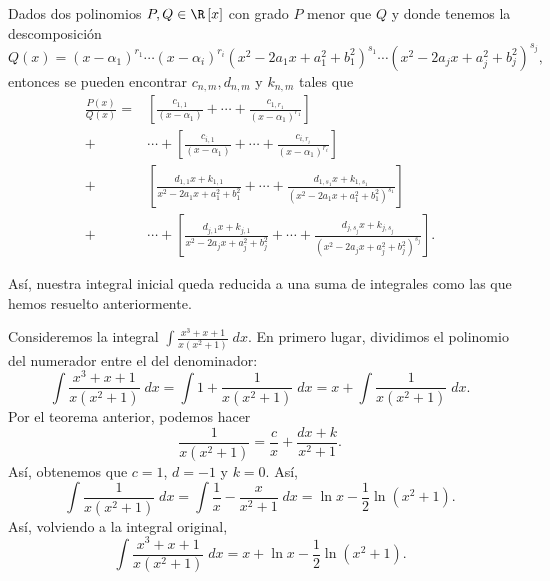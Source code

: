 \begin{ftheorem}[]
	\normalfont Dados dos polinomios $\displaystyle P,Q \in \R\left[x\right]  $ con grado $\displaystyle P $ menor que $\displaystyle Q $ y donde tenemos la descomposición
	\[Q\left(x\right) = \left(x-\alpha_{1}\right)^{r_{1}} \cdots \left(x-\alpha_{i}\right)^{r_{i}}\left(x^{2}-2a_{1}x+a_{1}^{2}+b^{2}_{1}\right)^{s _{1}} \cdots \left(x^{2}-2a_{j}x+a_{j}^{2}+b^{2}_{j}\right)^{s_{j}} ,\]
	entonces se pueden encontrar $\displaystyle c_{n,m}, d _{n,m} $ y $\displaystyle k_{n,m} $ tales que
	\[
	\begin{split}
		\frac{P\left(x\right)}{Q\left(x\right)} = & \left[\frac{c_{1,1}}{\left(x-\alpha_{1}\right)}+\cdots + \frac{c_{1,r_{1}}}{\left(x-\alpha_{1}\right)^{r_{1}}}\right] \\
		+ & \cdots + \left[\frac{c_{i,1}}{\left(x-\alpha_{1}\right)}+\cdots + \frac{c_{i,r_{i}}}{\left(x-\alpha_{1}\right)^{r_{i}}}\right] \\
		+ & \left[\frac{d _{1,1}x + k_{1,1}}{x^{2}-2a_{1}x+a_{1}^{2}+b^{2}_{1}}+ \cdots + \frac{d _{1,s _{1}}x + k_{1,s_{1}}}{(x^{2}-2a_{1}x+a_{1}^{2}+b^{2}_{1})^{s_{1}}}\right]\\
		+ & \cdots +\left[\frac{d _{j,1}x + k_{j,1}}{x^{2}-2a_{j}x+a_{j}^{2}+b^{2}_{j}}+ \cdots + \frac{d _{j,s _{j}}x + k_{j,s_{j}}}{(x^{2}-2a_{j}x+a_{j}^{2}+b^{2}_{j})^{s_{j}}}\right]  .
	\end{split}
	\]
\end{ftheorem}
Así, nuestra integral inicial queda reducida a una suma de integrales como las que hemos resuelto anteriormente.
\begin{eg}
\normalfont Consideremos la integral $\displaystyle \int \frac{x^{3}+x+1}{x\left(x^{2}+1\right)} \; dx $. En primero lugar, dividimos el polinomio del numerador entre el del denominador:
\[ \int \frac{x^{3}+x+1}{x\left(x^{2}+1\right)} \; dx = \int 1 + \frac{1}{x\left(x^{2}+1\right)} \; dx = x + \int \frac{1}{x\left(x^{2}+1\right)} \; dx.\]
Por el teorema anterior, podemos hacer
\[\frac{1}{x\left(x^{2}+1\right)} = \frac{c}{x} + \frac{dx+k}{x^{2}+1} .\]
Así, obtenemos que $\displaystyle c = 1 $, $\displaystyle d = - 1 $ y $\displaystyle k = 0 $. Así, 
\[ \int \frac{1}{x\left(x^{2}+1\right)} \; dx = \int \frac{1}{x}-\frac{x}{x^{2}+1} \; dx = \ln x - \frac{1}{2}\ln\left(x^{2}+1\right).\]
Así, volviendo a la integral original,
\[\int \frac{x^{3}+x+1}{x\left(x^{2}+1\right)} \; dx = x + \ln x - \frac{1}{2}\ln\left(x^{2}+1\right) .\]
\end{eg}
